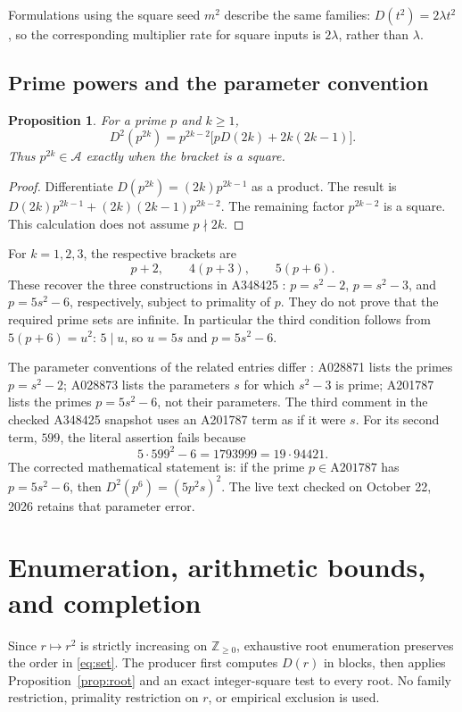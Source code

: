 \documentclass[11pt]{article}
\newtheorem{proposition}[theorem]{Proposition}
\theoremstyle{definition}
\theoremstyle{remark}
\newcommand{\NN}{\mathbb Z_{\geq0}}
\newcommand{\DD}{D^{2}}
\begin{document}
Formulations using the square seed $m^{2}$ describe the same families:
$D(t^{2})=2\lambda t^{2}$, so the corresponding multiplier rate for
square inputs is $2\lambda$, rather than $\lambda$.

\subsection{Prime powers and the parameter convention}\label{sec:powers}
\begin{proposition}\label{prop:power}
For a prime $p$ and $k\geq1$,
\begin{equation}\label{eq:power}
 \DD(p^{2k})=p^{2k-2}\bigl[pD(2k)+2k(2k-1)\bigr].
\end{equation}
Thus $p^{2k}\in\mathcal A$ exactly when the bracket is a square.
\end{proposition}
\begin{proof}
Differentiate $D(p^{2k})=(2k)p^{2k-1}$ as a product. The result is
$D(2k)p^{2k-1}+(2k)(2k-1)p^{2k-2}$. The remaining factor
$p^{2k-2}$ is a square. This calculation does not assume $p\nmid2k$.
\end{proof}

For $k=1,2,3$, the respective brackets are
\begin{equation}\label{eq:three}
 p+2,\qquad 4(p+3),\qquad 5(p+6).
\end{equation}
These recover the three constructions in A348425 \cite{oeis}:
$p=s^{2}-2$, $p=s^{2}-3$, and $p=5s^{2}-6$, respectively, subject
to primality of $p$. They do not prove that the required prime sets
are infinite. In particular the third condition follows from
$5(p+6)=u^{2}$: $5\mid u$, so $u=5s$ and $p=5s^{2}-6$.

The parameter conventions of the related entries differ
\cite{near2,near3,near5}: A028871 lists the primes $p=s^{2}-2$;
A028873 lists the parameters $s$ for which $s^{2}-3$ is prime;
A201787 lists the primes $p=5s^{2}-6$, not their parameters.
The third comment in the checked A348425 snapshot uses an A201787 term
as if it were $s$. For its second term, $599$, the literal assertion
fails because
\[
 5\cdot599^{2}-6=1793999=19\cdot94421.
\]
The corrected mathematical statement is: if the prime $p\in\mathrm{A201787}$
has $p=5s^{2}-6$, then $\DD(p^{6})=(5p^{2}s)^{2}$. The live text
checked on October 22, 2026 retains that parameter error.

\section{Enumeration, arithmetic bounds, and completion}\label{sec:algorithm}
Since $r\mapsto r^{2}$ is strictly increasing on $\NN$, exhaustive
root enumeration preserves the order in \eqref{eq:set}. The producer
first computes $D(r)$ in blocks, then applies Proposition~\ref{prop:root}
and an exact integer-square test to every root. No family restriction,
primality restriction on $r$, or empirical exclusion is used.
\end{document}
